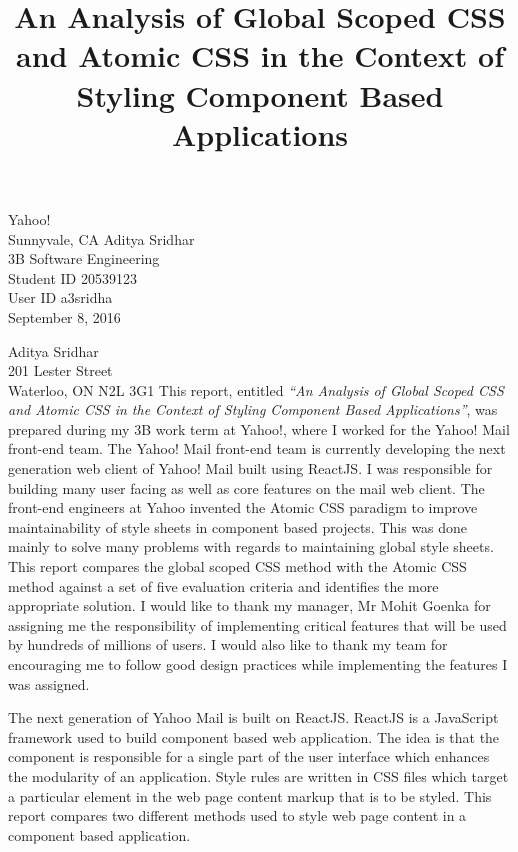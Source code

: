 \documentclass[12pt]{article}
\begin{document}
\title{An Analysis of Global Scoped CSS and Atomic CSS in the Context of Styling Component Based Applications}
{
	Yahoo!\\
	Sunnyvale, CA
}
{
	Aditya Sridhar\\
	3B Software Engineering\\
	Student ID 20539123\\
	User ID a3sridha\\
	September 8, 2016
}


{
	\noindent
	Aditya Sridhar\\
	201 Lester Street\\
	Waterloo, ON N2L 3G1
}
{
	This report, entitled \textit{“An Analysis of Global Scoped CSS and Atomic CSS in the Context of Styling Component Based Applications”}, was prepared during my 3B work term at Yahoo!, where I worked for the Yahoo! Mail front-end team.
}
{
	The Yahoo! Mail front-end team is currently developing the next generation web client of Yahoo! Mail built using ReactJS. I was responsible for building many user facing as well as core features on the mail web client.
}
{
	The front-end engineers at Yahoo invented the Atomic CSS paradigm to improve maintainability of style sheets in component based projects. This was done mainly to solve many problems with regards to maintaining global style sheets. This report compares the global scoped CSS method with the Atomic CSS method against a set of five evaluation criteria and identifies the more appropriate solution.
}
{
	I would like to thank my manager, Mr Mohit Goenka for assigning me the responsibility of implementing critical features that will be used by hundreds of millions of users. I would also like to thank my team for encouraging me to follow good design practices while implementing the features I was assigned.
}




The next generation of Yahoo Mail is built on ReactJS. ReactJS is a JavaScript framework used to build component based web application. The idea is that the component is responsible for a single part of the user interface which enhances the modularity of an application. Style rules are written in CSS files which target a particular element in the web page content markup that is to be styled. This report compares two different methods used to style web page content in a component based application.
\end{document}
